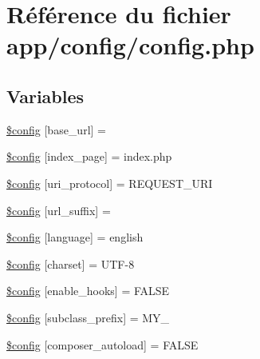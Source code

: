 \hypertarget{config_8php}{}\section{Référence du fichier app/config/config.php}
\label{config_8php}
\subsection*{Variables}
\begin{DoxyCompactItemize}
\item 
\hyperlink{config_8php_ab7d3dc1aba181a1198e7f26609046673}{\$config} \mbox{[}\textquotesingle{}base\+\_\+url\textquotesingle{}\mbox{]} = \textquotesingle{}\textquotesingle{}
\item 
\hyperlink{config_8php_a58f062e2a0bc777dad9a430970a7e50b}{\$config} \mbox{[}\textquotesingle{}index\+\_\+page\textquotesingle{}\mbox{]} = \textquotesingle{}index.\+php\textquotesingle{}
\item 
\hyperlink{config_8php_a7e0a80976b25629e97a7c93f1d278d99}{\$config} \mbox{[}\textquotesingle{}uri\+\_\+protocol\textquotesingle{}\mbox{]} = \textquotesingle{}R\+E\+Q\+U\+E\+S\+T\+\_\+\+U\+RI\textquotesingle{}
\item 
\hyperlink{config_8php_ad1183c73fa84c832075d7220c49dc6b2}{\$config} \mbox{[}\textquotesingle{}url\+\_\+suffix\textquotesingle{}\mbox{]} = \textquotesingle{}\textquotesingle{}
\item 
\hyperlink{config_8php_a36e8d14df9a48c1e0945975109946e8b}{\$config} \mbox{[}\textquotesingle{}language\textquotesingle{}\mbox{]} = \textquotesingle{}english\textquotesingle{}
\item 
\hyperlink{config_8php_a071d6716931a0a13a16629257e9ef345}{\$config} \mbox{[}\textquotesingle{}charset\textquotesingle{}\mbox{]} = \textquotesingle{}U\+TF-\/8\textquotesingle{}
\item 
\hyperlink{config_8php_ae152db70ca5fa75e4b1cea6ac02116de}{\$config} \mbox{[}\textquotesingle{}enable\+\_\+hooks\textquotesingle{}\mbox{]} = F\+A\+L\+SE
\item 
\hyperlink{config_8php_a815be6a457c426ff84d3a1c589c6853e}{\$config} \mbox{[}\textquotesingle{}subclass\+\_\+prefix\textquotesingle{}\mbox{]} = \textquotesingle{}M\+Y\+\_\+\textquotesingle{}
\item 
\hyperlink{config_8php_af175f69a791ec78be5bc6c6ecf6176e9}{\$config} \mbox{[}\textquotesingle{}composer\+\_\+autoload\textquotesingle{}\mbox{]} = F\+A\+L\+SE
\item 

\end{DoxyCompactItemize}

